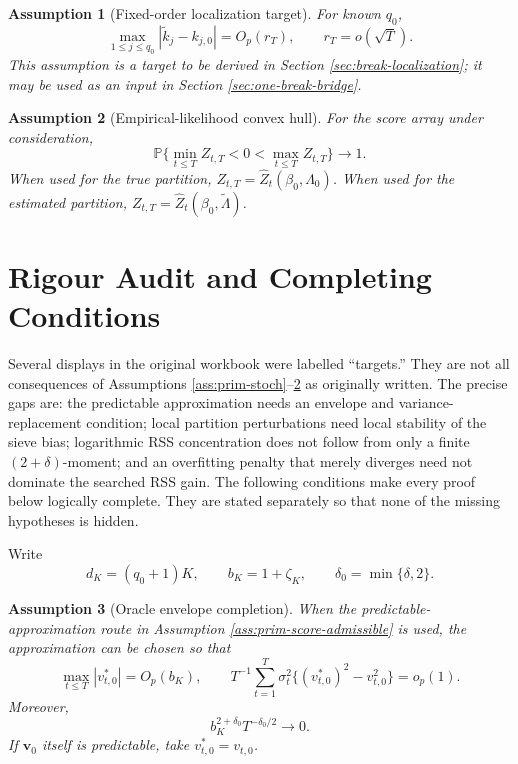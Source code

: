 \documentclass[12pt]{article}
\numberwithin{equation}{section}
\newtheorem{assumption}{Assumption}
\theoremstyle{definition}
\newcommand{\Pp}{\mathbb P}
\begin{document}
\begin{assumption}[Fixed-order localization target]
\label{ass:prim-localization-target}
For known \(q_0\),
\[
    \max_{1\leq j\leq q_0}|\widetilde k_j-k_{j,0}|=O_p(r_T),
    \qquad
    r_T=o(\sqrt T).
\]
This assumption is a target to be derived in Section \ref{sec:break-localization}; it may be used as an input in Section \ref{sec:one-break-bridge}.
\end{assumption}

\begin{assumption}[Empirical-likelihood convex hull]
\label{ass:prim-convex}
For the score array under consideration,
\[
    \Pp\{\min_{t\leq T}Z_{t,T}<0<\max_{t\leq T}Z_{t,T}\}\to1.
\]
When used for the true partition, \(Z_{t,T}=\widehat Z_t(\beta_0,\Lambda_0)\). When used for the estimated partition, \(Z_{t,T}=\widehat Z_t(\beta_0,\widetilde\Lambda)\).
\end{assumption}


\section{Rigour Audit and Completing Conditions}
\label{sec:rigour-audit}

Several displays in the original workbook were labelled ``targets.''  They
are not all consequences of Assumptions \ref{ass:prim-stoch}--\ref{ass:prim-convex}
as originally written.  The precise gaps are: the predictable approximation
needs an envelope and variance-replacement condition; local partition
perturbations need local stability of the sieve bias; logarithmic RSS
concentration does not follow from only a finite \((2+\delta)\)-moment; and an
overfitting penalty that merely diverges need not dominate the searched RSS
gain.  The following conditions make every proof below logically complete.
They are stated separately so that none of the missing hypotheses is hidden.

Write
\[
    d_K=(q_0+1)K,
    \qquad b_K=1+\zeta_K,
    \qquad \delta_0=\min\{\delta,2\}.
\]

\begin{assumption}[Oracle envelope completion]
\label{ass:sol-oracle-envelope}
When the predictable-approximation route in Assumption
\ref{ass:prim-score-admissible} is used, the approximation can be chosen so
that
\[
    \max_{t\leq T}|v_{t,0}^\ast|=O_p(b_K),
    \qquad
    T^{-1}\sum_{t=1}^T\sigma_t^2
       \{(v_{t,0}^\ast)^2-v_{t,0}^2\}=o_p(1).
\]
Moreover,
\begin{equation}
    b_K^{2+\delta_0}T^{-\delta_0/2}\longrightarrow0.
    \label{eq:sol-envelope-rate}
\end{equation}
If \(\bm v_0\) itself is predictable, take \(v_{t,0}^\ast=v_{t,0}\).
\end{assumption}
\end{document}
